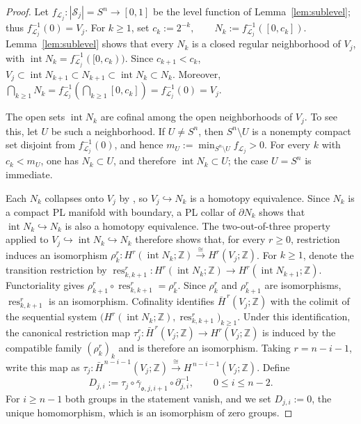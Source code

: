 \documentclass[12pt,oneside,a4paper]{article}
\theoremstyle{mytheorem}
\theoremstyle{remark}
\theoremstyle{definition}
\begin{document}
\begin{proof}
Let $f_{\mathcal{L}_j}:|\mathcal S_j|=S^n\to [0,1]$ be the level
function of Lemma~\ref{lem:sublevel}; thus
$f_{\mathcal{L}_j}^{-1}(0)=V_j$.  For $k\geq1$, set
$c_k:=2^{-k},\qquad N_k:=f_{\mathcal{L}_j}^{-1}([0,c_k]).$
Lemma~\ref{lem:sublevel} shows that every $N_k$ is a closed regular
neighborhood of $V_j$, with
$\operatorname{int}N_k=f_{\mathcal{L}_j}^{-1}([0,c_k))$.
Since $c_{k+1}<c_k$,
\(V_j\subset\operatorname{int}N_{k+1}
\subset N_{k+1}
\subset\operatorname{int}N_k
\subset N_k\).
Moreover,
\(\bigcap_{k\geq1}N_k
=f_{\mathcal{L}_j}^{-1}\!\left(\bigcap_{k\geq1}[0,c_k]\right)
=f_{\mathcal{L}_j}^{-1}(0)=V_j\).

The open sets $\operatorname{int}N_k$ are cofinal among the open
neighborhoods of $V_j$.  To see this, let $U$ be such a neighborhood.
If $U\neq S^n$, then $S^n\setminus U$ is a nonempty compact set
disjoint from $f_{\mathcal{L}_j}^{-1}(0)$, and hence
$m_U:=\min_{S^n\setminus U}f_{\mathcal{L}_j}>0$.
For every $k$ with $c_k<m_U$, one has
$N_k\subset U$, and therefore $\operatorname{int}N_k\subset U$; the
case $U=S^n$ is immediate.

Each $N_k$ collapses onto $V_j$ by
\cite[Theorem~3.16]{zbMATH01714503}, so
$V_j\hookrightarrow N_k$ is a homotopy equivalence.  Since $N_k$ is a
compact PL manifold with boundary, a PL collar of $\partial N_k$
\cite[Corollary~2.5]{zbMATH01714503} shows that
$\operatorname{int}N_k\hookrightarrow N_k$ is also a homotopy
equivalence.  The two-out-of-three property applied to
\(V_j\hookrightarrow\operatorname{int}N_k\hookrightarrow N_k\)
therefore shows that, for every $r\geq0$, restriction induces an
isomorphism
\(\rho_k^r:
H^r(\operatorname{int}N_k;\mathbb Z)
\xrightarrow{\ \cong\ }
H^r(V_j;\mathbb Z)\).
For $k\geq1$, denote the transition restriction by
\(\operatorname{res}_{k,k+1}^r:
H^r(\operatorname{int}N_k;\mathbb Z)
\to H^r(\operatorname{int}N_{k+1};\mathbb Z)\).
Functoriality gives
\(\rho_{k+1}^r\circ\operatorname{res}_{k,k+1}^r=\rho_k^r\).
Since $\rho_k^r$ and $\rho_{k+1}^r$ are isomorphisms,
$\operatorname{res}_{k,k+1}^r$ is an isomorphism.  Cofinality
identifies $\bar H^{\,r}(V_j;\mathbb Z)$ with the colimit of the
sequential system
\(\bigl(H^r(\operatorname{int}N_k;\mathbb Z),
\operatorname{res}_{k,k+1}^r\bigr)_{k\geq1}\).
Under this
identification, the canonical restriction map
\(\tau_j^r:
\bar H^{\,r}(V_j;\mathbb Z)
\to  H^r(V_j;\mathbb Z)\)
is induced by the compatible family $(\rho_k^r)_k$ and is therefore
an isomorphism.  Taking $r=n-i-1$, write this map as
\(\tau_j:
\bar H^{\,n-i-1}(V_j;\mathbb Z)
\xrightarrow{\ \cong\ }
H^{\,n-i-1}(V_j;\mathbb Z)\).
Define
\[
D_{j,i}:=\tau_j\circ\bar\gamma_{\mathfrak o,j,i+1}\circ\partial_{j,i}^{-1},
\qquad 0\leq i\leq n-2.
\]
For $i\geq n-1$ both groups in the statement vanish, and we set
$D_{j,i}:=0$, the unique homomorphism, which is an isomorphism of zero
groups.


\end{proof}
\end{document}
